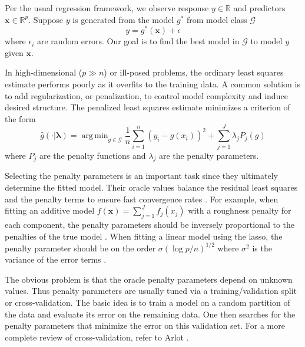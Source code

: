 \documentclass[12pt]{article}
\DeclareMathOperator*{\argmin}{arg\,min}
\begin{document}
Per the usual regression framework, we observe response $y \in \mathbb{R}$ and predictors $\boldsymbol {x} \in \mathbb{R}^p$. Suppose $y$ is generated from the model $g^*$ from model class $\mathcal{G}$
\begin{equation}
y = g^*(\boldsymbol x) + \epsilon
\end{equation}
where $\epsilon_i$ are random errors. Our goal is to find the best model in $\mathcal{G}$ to model $y$ given $\boldsymbol x$.

In high-dimensional ($p \gg n$) or ill-posed problems, the ordinary least squares estimate performs poorly as it overfits to the training data. A common solution is to add regularization, or penalization, to control model complexity and induce desired structure. The penalized least squares estimate minimizes a criterion of the form
\begin{equation}
\label{intro_train_criterion}
\hat{g}(\cdot | \boldsymbol \lambda) = \argmin_{g\in \mathcal{G}} \frac{1}{n} \sum_{i=1}^n \left (y_i -  g(x_i) \right )^2 + \sum_{j=1}^J \lambda_j P_j(g)
\end{equation}
where $P_j$ are the penalty functions and $\lambda_j$ are the penalty parameters.

Selecting the penalty parameters is an important task since they ultimately determine the fitted model. Their oracle values balance the residual least squares and the penalty terms to ensure fast convergence rates \citep{van2000empirical}. For example, when fitting an additive model $f(\boldsymbol x) = \sum_{j=1}^J f_j(x_j)$ with a roughness penalty for each component, the penalty parameters should be inversely proportional to the penalties of the true model \citep{van2014additive}. When fitting a linear model using the lasso, the penalty parameter should be on the order $\sigma (\log p /n )^{1/2}$ where $\sigma^2$ is the variance of the error terms \citep{buhlmann2011statistics}.

The obvious problem is that the oracle penalty parameters depend on unknown values. Thus penalty parameters are usually tuned via a training/validation split or cross-validation. The basic idea is to train a model on a random partition of the data and evaluate its error on the remaining data. One then searches for the penalty parameters that minimize the error on this validation set. For a more complete review of cross-validation, refer to Arlot \citep{arlot2010survey}.
\end{document}
